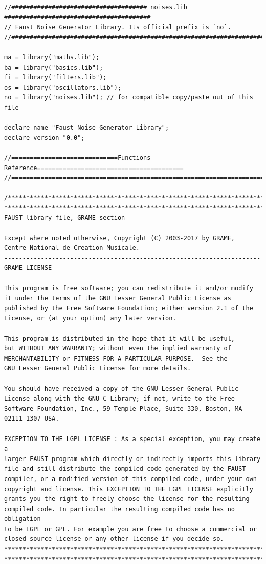 \documentclass{article}
\begin{document}
\bigskip\bigskip
\begin{lstlisting}[caption=\texttt{noises.lib}]
//##################################### noises.lib ########################################
// Faust Noise Generator Library. Its official prefix is `no`.
//########################################################################################

ma = library("maths.lib");
ba = library("basics.lib");
fi = library("filters.lib");
os = library("oscillators.lib");
no = library("noises.lib"); // for compatible copy/paste out of this file

declare name "Faust Noise Generator Library";
declare version "0.0";

//=============================Functions Reference========================================
//========================================================================================

/************************************************************************
************************************************************************
FAUST library file, GRAME section

Except where noted otherwise, Copyright (C) 2003-2017 by GRAME,
Centre National de Creation Musicale.
----------------------------------------------------------------------
GRAME LICENSE

This program is free software; you can redistribute it and/or modify
it under the terms of the GNU Lesser General Public License as
published by the Free Software Foundation; either version 2.1 of the
License, or (at your option) any later version.

This program is distributed in the hope that it will be useful,
but WITHOUT ANY WARRANTY; without even the implied warranty of
MERCHANTABILITY or FITNESS FOR A PARTICULAR PURPOSE.  See the
GNU Lesser General Public License for more details.

You should have received a copy of the GNU Lesser General Public
License along with the GNU C Library; if not, write to the Free
Software Foundation, Inc., 59 Temple Place, Suite 330, Boston, MA
02111-1307 USA.

EXCEPTION TO THE LGPL LICENSE : As a special exception, you may create a
larger FAUST program which directly or indirectly imports this library
file and still distribute the compiled code generated by the FAUST
compiler, or a modified version of this compiled code, under your own
copyright and license. This EXCEPTION TO THE LGPL LICENSE explicitly
grants you the right to freely choose the license for the resulting
compiled code. In particular the resulting compiled code has no obligation
to be LGPL or GPL. For example you are free to choose a commercial or
closed source license or any other license if you decide so.
************************************************************************
************************************************************************/


\end{lstlisting}
\end{document}
